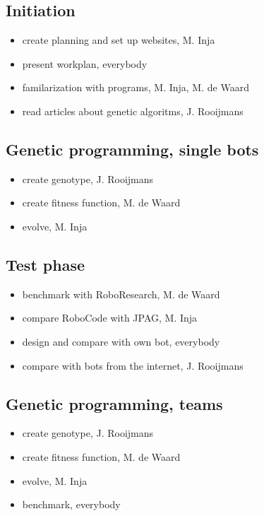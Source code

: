 \documentclass[a4paper,10pt]{article}
\begin{document}
\subsection{Initiation}
\begin{itemize}
\item create planning and set up websites, M. Inja
\item present workplan, everybody
\item familarization with programs, M. Inja, M. de Waard
\item read articles about genetic algoritms, J. Rooijmans
\end{itemize}

\subsection{Genetic programming, single bots}
\begin{itemize}
\item create genotype, J. Rooijmans
\item create fitness function, M. de Waard
\item evolve, M. Inja
\end{itemize}

\subsection{Test phase}
\begin{itemize}
\item benchmark with RoboResearch, M. de Waard
\item compare RoboCode with JPAG, M. Inja
\item design and compare with own bot, everybody
\item compare with bots from the internet, J. Rooijmans
\end{itemize}

\subsection{Genetic programming, teams}
\begin{itemize}
\item create genotype, J. Rooijmans
\item create fitness function, M. de Waard
\item evolve, M. Inja
\item benchmark, everybody
\end{itemize}
\newpage


\newpage
\appendix
\end{document}
